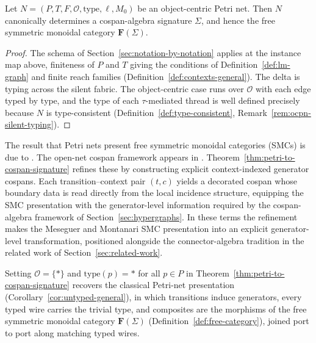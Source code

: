 \begin{theorem}
  \label{thm:petri-to-cospan-signature}
  Let \(N=(P,T,F,\mathcal{O},\mathrm{type},\ell,M_0)\) be an object-centric Petri net. Then \(N\) canonically determines a cospan-algebra signature \(\Sigma\), and hence the free symmetric monoidal category \(\mathbf{F}(\Sigma)\).
\end{theorem}

\begin{proof}
  The schema of Section~\ref{sec:notation-by-notation} applies at the instance map above,
  finiteness of $P$ and $T$ giving the conditions of Definition~\ref{def:lm-graph} and finite
  reach families (Definition~\ref{def:contexts-general}). The delta is typing across the silent fabric. The
  object-centric case runs over $\mathcal{O}$ with each edge typed by $\mathrm{type}$, and the
  type of each $\tau$-mediated thread is well defined precisely because $N$ is type-consistent
  (Definition~\ref{def:type-consistent}, Remark~\ref{rem:ocpn-silent-typing}).
\end{proof}

\begin{remark}\label{rem:smc-positioning}
  The result that Petri nets present free symmetric monoidal categories (SMCs) is due to
  \citet{meseguerPetriNetsAre1990}. The open-net cospan
  framework appears in \citet{baezOpenPetriNets2020}.
  Theorem~\ref{thm:petri-to-cospan-signature} refines these by constructing
  explicit context-indexed generator cospans. Each transition--context pair $(t,c)$
  yields a decorated cospan whose boundary data is read directly from the local
  incidence structure, equipping the SMC presentation with the generator-level
  information required by the cospan-algebra framework of
  Section~\ref{sec:hypergraphs}.
  In these terms the refinement makes the Meseguer and Montanari SMC
  presentation into an explicit generator-level transformation, positioned
  alongside the connector-algebra tradition in the related work of
  Section~\ref{sec:related-work}.
\end{remark}

\begin{corollary}\label{cor:petri-untyped}
  Setting $\mathcal{O}=\{\ast\}$ and $\mathrm{type}(p)=\ast$ for all $p\in P$ in
  Theorem~\ref{thm:petri-to-cospan-signature} recovers the classical Petri-net
  presentation (Corollary~\ref{cor:untyped-general}), in which transitions induce generators,
  every typed wire carries the trivial type, and composites are the morphisms of the free
  symmetric monoidal category $\mathbf{F}(\Sigma)$ (Definition~\ref{def:free-category}), joined
  port to port along matching typed wires.
\end{corollary}

